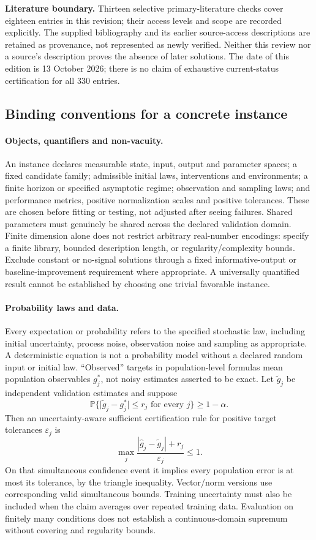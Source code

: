 \documentclass[11pt]{article}
\begin{document}
\textbf{Literature boundary.} Thirteen selective primary-literature checks cover eighteen entries in this revision; their access levels and scope are recorded explicitly. The supplied bibliography and its earlier source-access descriptions are retained as provenance, not represented as newly verified. Neither this review nor a source's description proves the absence of later solutions. The date of this edition is 13 October 2026; there is no claim of exhaustive current-status certification for all 330 entries.

\subsection*{Binding conventions for a concrete instance}
\paragraph{Objects, quantifiers and non-vacuity.}
An instance declares measurable state, input, output and parameter spaces; a fixed candidate family; admissible initial laws, interventions and environments; a finite horizon or specified asymptotic regime; observation and sampling laws; and performance metrics, positive normalization scales and positive tolerances. These are chosen before fitting or testing, not adjusted after seeing failures. Shared parameters must genuinely be shared across the declared validation domain. Finite dimension alone does not restrict arbitrary real-number encodings: specify a finite library, bounded description length, or regularity/complexity bounds. Exclude constant or no-signal solutions through a fixed informative-output or baseline-improvement requirement where appropriate. A universally quantified result cannot be established by choosing one trivial favorable instance.

\paragraph{Probability laws and data.}
Every expectation or probability refers to the specified stochastic law, including initial uncertainty, process noise, observation noise and sampling as appropriate. A deterministic equation is not a probability model without a declared random input or initial law. ``Observed'' targets in population-level formulas mean population observables $g_j^*$, not noisy estimates asserted to be exact. Let $\widetilde g_j$ be independent validation estimates and suppose
\[
\mathbb{P}\{\lvert\widetilde g_j-g_j^*\rvert\le r_j\text{ for every }j\}\ge1-\alpha.
\]
Then an uncertainty-aware sufficient certification rule for positive target tolerances $\varepsilon_j$ is
\[
\max_j\frac{|\widehat g_j-\widetilde g_j|+r_j}{\varepsilon_j}\le1.
\]
On that simultaneous confidence event it implies every population error is at most its tolerance, by the triangle inequality. Vector/norm versions use corresponding valid simultaneous bounds. Training uncertainty must also be included when the claim averages over repeated training data. Evaluation on finitely many conditions does not establish a continuous-domain supremum without covering and regularity bounds.
\end{document}

